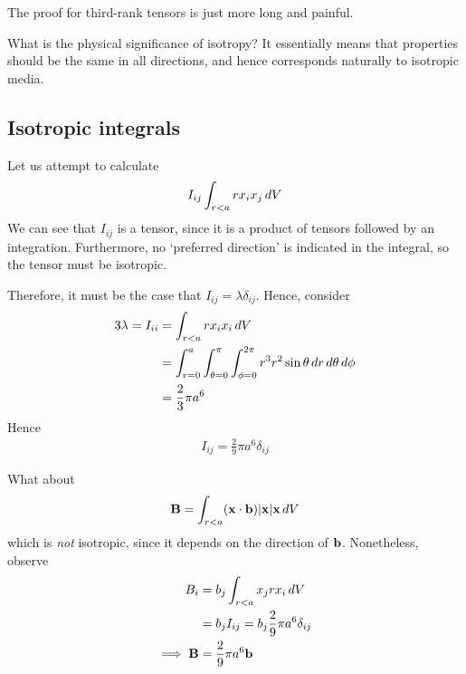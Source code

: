 \documentclass{../template/note}
\begin{document}
    The proof for third-rank tensors is just more long and painful.

    What is the physical significance of isotropy? It essentially means that properties should be the same in all directions, and hence corresponds naturally to isotropic media.

    \subsection{Isotropic integrals}

    \begin{example*}
        Let us attempt to calculate
        \begin{align*}
            I_{ij} \int_{r < a} rx_ix_j \,d{V}
        \end{align*}
        We can see that \(I_{ij}\) is a tensor, since it is a product of tensors followed by an integration. Furthermore, no `preferred direction' is indicated in the integral, so the tensor must be isotropic.

        Therefore, it must be the case that \(I_{ij} = \lambda \delta_{ij}\). Hence, consider
        \begin{align*}
            3\lambda = I_{ii} &= \int_{r < a} r x_i x_i \,d{V} \\
            &= \int_{r=0}^a \int_{\theta=0}^{\pi} \int_{\phi=0}^{2\pi} r^3 r^2 \sin \theta \,d{r} \,d{\theta} \,d{\phi} \\
            &= \frac{2}{3}\pi a^6
        \end{align*}
        Hence
        \begin{align*}
            I_{ij} = \frac 2 9 \pi a^6 \delta_{ij}
        \end{align*}
    \end{example*}
    
    \begin{example*}
        What about
        \begin{align*}
            \V B = \int_{r < a} (\V x \cdot \V b)|\V x|\V x \D V
        \end{align*}
        which is \emph{not} isotropic, since it depends on the direction of \(\V b\). Nonetheless, observe
        \begin{align*}
            B_i &= b_j \int_{r < a} x_j r x_i \D V \\
            &= b_j I_{ij} = b_j \frac 2 9 \pi a^6 \delta_{ij} \\
            \implies \V B &= \frac 2 9 \pi a^6 \V b
        \end{align*}
    \end{example*}
    
\end{document}
